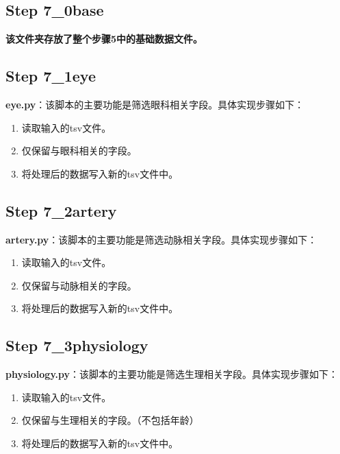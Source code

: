 \documentclass[UTF8]{report}
\theoremstyle{MyLineTheoremStyle} %
\theoremstyle{MyBlockTheoremStyle} %
\theoremstyle{MySubsubsectionStyle} %
\begin{document}
\subsection*{Step 7\_0base}

\textbf{该文件夹存放了整个步骤5中的基础数据文件。}\par


\subsection*{Step 7\_1eye}

\textbf{eye.py}：该脚本的主要功能是筛选眼科相关字段。具体实现步骤如下：
\begin{enumerate}
    \item 读取输入的tsv文件。
    \item 仅保留与眼科相关的字段。
    \item 将处理后的数据写入新的tsv文件中。
\end{enumerate}

\subsection*{Step 7\_2artery}

\textbf{artery.py}：该脚本的主要功能是筛选动脉相关字段。具体实现步骤如下：
\begin{enumerate}
    \item 读取输入的tsv文件。
    \item 仅保留与动脉相关的字段。
    \item 将处理后的数据写入新的tsv文件中。
\end{enumerate} 

\subsection*{Step 7\_3physiology}

\textbf{physiology.py}：该脚本的主要功能是筛选生理相关字段。具体实现步骤如下：
\begin{enumerate}
    \item 读取输入的tsv文件。
    \item 仅保留与生理相关的字段。（不包括年龄）
    \item 将处理后的数据写入新的tsv文件中。
\end{enumerate}
\end{document}
